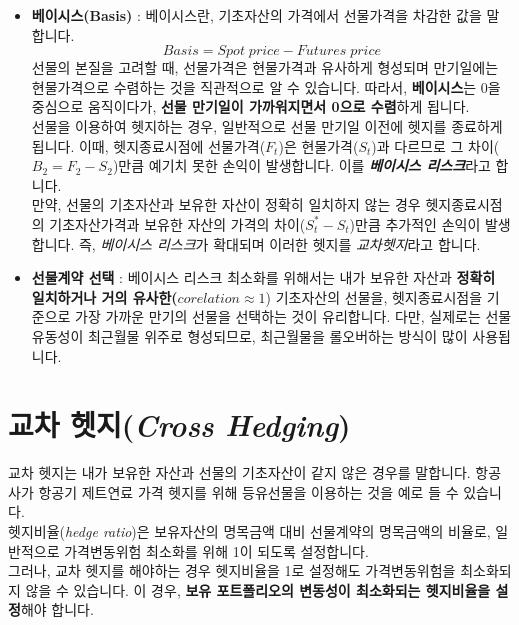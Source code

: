 \documentclass[
  letterpaper,
  DIV=11,
  numbers=noendperiod]{scrreprt}
\begin{document}
\begin{itemize}
\item
  \textbf{베이시스(Basis)} : 베이시스란, 기초자산의 가격에서 선물가격을
  차감한 값을 말합니다. \[Basis = Spot\;price - Futures\;price\] 선물의
  본질을 고려할 때, 선물가격은 현물가격과 유사하게 형성되며 만기일에는
  현물가격으로 수렴하는 것을 직관적으로 알 수 있습니다. 따라서,
  \textbf{베이시스}는 0을 중심으로 움직이다가, \textbf{선물 만기일이
  가까워지면서 0으로 수렴}하게 됩니다.\\
  선물을 이용하여 헷지하는 경우, 일반적으로 선물 만기일 이전에 헷지를
  종료하게 됩니다. 이때, 헷지종료시점에 선물가격(\(F_t\))은
  현물가격(\(S_t\))과 다르므로 그 차이(\(B_2=F_2-S_2\))만큼 예기치 못한
  손익이 발생합니다. 이를 \textbf{\emph{베이시스 리스크}}라고 합니다.\\
  만약, 선물의 기초자산과 보유한 자산이 정확히 일치하지 않는 경우
  헷지종료시점의 기초자산가격과 보유한 자산의 가격의
  차이(\(S^*_t-S_t\))만큼 추가적인 손익이 발생합니다. 즉, \emph{베이시스
  리스크}가 확대되며 이러한 헷지를 \emph{교차헷지}라고 합니다.
\item
  \textbf{선물계약 선택} : 베이시스 리스크 최소화를 위해서는 내가 보유한
  자산과 \textbf{정확히 일치하거나 거의 유사한(}\(corelation\approx 1\))
  기초자산의 선물을, 헷지종료시점을 기준으로 가장 가까운 만기의 선물을
  선택하는 것이 유리합니다. 다만, 실제로는 선물 유동성이 최근월물 위주로
  형성되므로, 최근월물을 롤오버하는 방식이 많이 사용됩니다.
\end{itemize}

\section*{\texorpdfstring{교차 헷지(\emph{Cross
Hedging})}{교차 헷지(Cross Hedging)}}\label{uxad50uxcc28-uxd5f7uxc9c0cross-hedging}


교차 헷지는 내가 보유한 자산과 선물의 기초자산이 같지 않은 경우를
말합니다. 항공사가 항공기 제트연료 가격 헷지를 위해 등유선물을 이용하는
것을 예로 들 수 있습니다.\\
헷지비율(\emph{hedge ratio})은 보유자산의 명목금액 대비 선물계약의
명목금액의 비율로, 일반적으로 가격변동위험 최소화를 위해 1이 되도록
설정합니다.\\
그러나, 교차 헷지를 해야하는 경우 헷지비율을 1로 설정해도 가격변동위험을
최소화되지 않을 수 있습니다. 이 경우, \textbf{보유 포트폴리오의 변동성이
최소화되는 헷지비율을 설정}해야 합니다.
\end{document}
